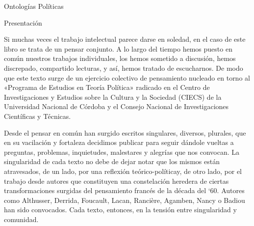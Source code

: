 




\frontmatter

{Ontologías Políticas}

%
%
%
%
%
%
%
%

%
%
%
%
%
%
%
%
%
%
%
%
%
%
%
%
%
%

{Presentación}

Si muchas veces el trabajo intelectual parece darse en soledad, en el caso de este libro se trata de un pensar conjunto. A lo largo del tiempo hemos puesto en común nuestros trabajos individuales, los hemos sometido a discusión, hemos discrepado, compartido lecturas, y así, hemos tratado de escucharnos. De modo que este texto surge de un ejercicio colectivo de pensamiento nucleado en torno al «Programa de Estudios en Teoría Política» radicado en el Centro de Investigaciones y Estudios sobre la Cultura y la Sociedad (CIECS) de la Universidad Nacional de Córdoba y el Consejo Nacional de Investigaciones Científicas y Técnicas.

Desde el pensar en común han surgido escritos singulares, diversos, plurales, que en su vacilación y fortaleza decidimos publicar para seguir dándole vueltas a preguntas, problemas, inquietudes, malestares y alegrías que nos convocan. La singularidad de cada texto no debe de dejar notar que los mismos están atravesados, de un lado, por una reflexión teórico-políticay, de otro lado, por el trabajo desde autores que constituyen una constelación heredera de ciertas transformaciones surgidas del pensamiento francés de la década del `60. Autores como Althusser, Derrida, Foucault, Lacan, Rancière, Agamben, Nancy o Badiou han sido convocados. Cada texto, entonces, en la tensión entre singularidad y comunidad.

